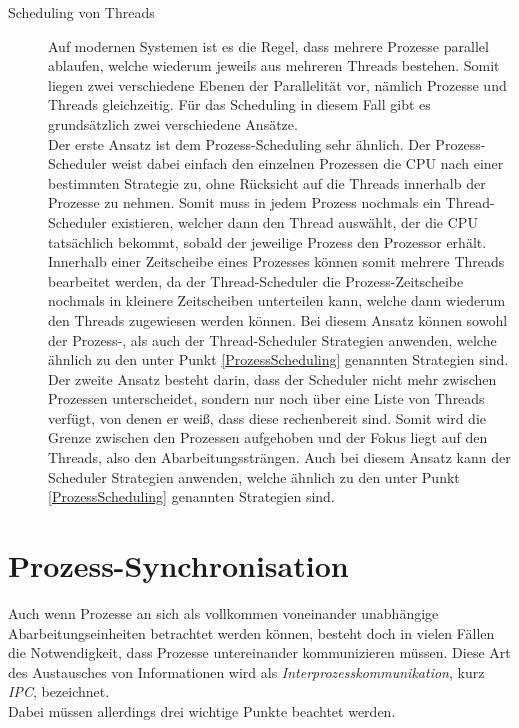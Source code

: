 \begin{description}
					\item[Scheduling von Threads]
					
						Auf modernen Systemen ist es die Regel, dass mehrere Prozesse parallel ablaufen, welche wiederum jeweils aus mehreren Threads bestehen. Somit liegen zwei verschiedene Ebenen der Parallelität vor, nämlich Prozesse und Threads gleichzeitig. Für das Scheduling in diesem Fall gibt es grundsätzlich zwei verschiedene Ansätze.\\
						Der erste Ansatz ist dem Prozess-Scheduling sehr ähnlich. Der Prozess-Scheduler weist dabei einfach den einzelnen Prozessen die CPU nach einer bestimmten Strategie zu, ohne Rücksicht auf die Threads innerhalb der Prozesse zu nehmen. Somit muss in jedem Prozess nochmals ein Thread-Scheduler existieren, welcher dann den Thread auswählt, der die CPU tatsächlich bekommt, sobald der jeweilige Prozess den Prozessor erhält. Innerhalb einer Zeitscheibe eines Prozesses können somit mehrere Threads bearbeitet werden, da der Thread-Scheduler die Prozess-Zeitscheibe nochmals in kleinere Zeitscheiben unterteilen kann, welche dann wiederum den Threads zugewiesen werden können. Bei diesem Ansatz können sowohl der Prozess-, als auch der Thread-Scheduler Strategien anwenden, welche ähnlich zu den unter Punkt \ref{ProzessScheduling} genannten Strategien sind.
						Der zweite Ansatz besteht darin, dass der Scheduler nicht mehr zwischen Prozessen unterscheidet, sondern nur noch über eine Liste von Threads verfügt, von denen er weiß, dass diese rechenbereit sind. Somit wird die Grenze zwischen den Prozessen aufgehoben und der Fokus liegt auf den Threads, also den Abarbeitungssträngen. Auch bei diesem Ansatz kann der Scheduler Strategien anwenden, welche ähnlich zu den unter Punkt \ref{ProzessScheduling} genannten Strategien sind. \cite{ModerneBetriebssysteme}
				\end{description}
			
	\section{Prozess-Synchronisation \cite{ModerneBetriebssysteme}}
		\label{ProzessSynchronisation}
	
		Auch wenn Prozesse an sich als vollkommen voneinander unabhängige Abarbeitungseinheiten betrachtet werden können, besteht doch in vielen Fällen die Notwendigkeit, dass Prozesse untereinander kommunizieren müssen. Diese Art des Austausches von Informationen wird als \textit{Interprozesskommunikation}, kurz \textit{IPC}, bezeichnet.\\
		Dabei müssen allerdings drei wichtige Punkte beachtet werden.
		

